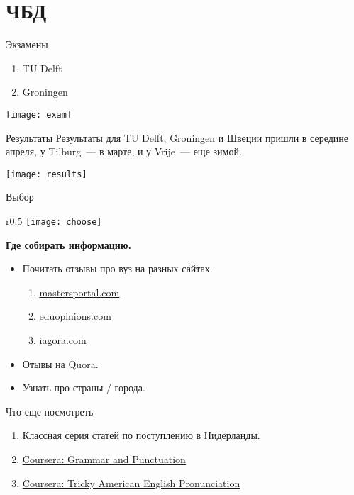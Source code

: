 \documentclass[handout,xcolor={usenames,dvipsnames,svgnames,table,rgb}]{beamer}
\let\oldhref\href
\renewcommand{\href}[2]{\oldhref{#1}{\color{NavyBlue}\underline{#2}}}
\begin{document}
\section{ЧБД}
\begin{frame}{Экзамены}
\begin{enumerate}[<+- | alert@+>]
\item TU Delft
\item Groningen
\end{enumerate}

\begin{center}
\texttt{[image: exam]}
\end{center}
\end{frame}

\begin{frame}{Результаты}
Результаты для TU Delft, Groningen и Швеции пришли в середине апреля, у Tilburg~--- в марте, и у Vrije~---  еще зимой.
\begin{center}
\texttt{[image: results]}
\end{center}
\end{frame}

\begin{frame}{Выбор}
\begin{wrapfigure}{r}{0.5\textwidth}
    \centering
    \texttt{[image: choose]}
\end{wrapfigure} 
    \textbf{Где собирать информацию.}
\begin{itemize}[<+- | alert@+>]
\item Почитать отзывы про вуз на разных сайтах.
    \begin{enumerate}
    \item \href{https://www.mastersportal.com}{mastersportal.com}
    \item \href{https://www.eduopinions.com}{eduopinions.com}
    \item \href{https://www.iagora.com}{iagora.com}
    \end{enumerate}
\item Отывы на Quora.
\item Узнать про страны / города.
\end{itemize}
\end{frame}

\begin{frame}{Что еще посмотреть}
    \begin{enumerate}
\item \href{https://medium.com/там-где-мы-есть/как-поступить-в-вуз-в-голландии-разбираем-на-конкретном-примере-часть-1-e4b875080533}{Классная серия статей по поступлению в Нидерланды.}
\item \href{https://www.coursera.org/learn/grammar-punctuation}{Coursera: Grammar and Punctuation} 
    \item \href{https://www.coursera.org/learn/tricky-american-english-pronunciation}{Coursera: Tricky American English Pronunciation}
 \end{enumerate}
\end{frame}
\end{document}
